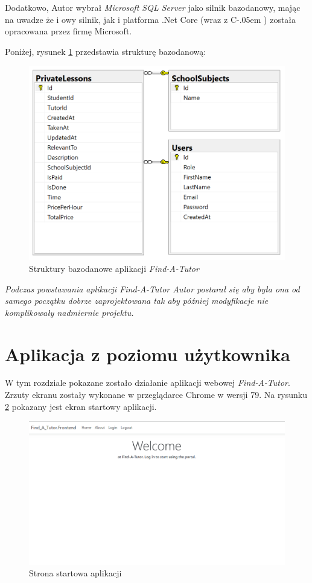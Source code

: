 \documentclass[12pt]{article}
\newcommand{\Csharp}{%
  {\settoheight{\dimen0}{C}C\kern-.05em \resizebox{!}{\dimen0}{\raisebox{\depth}{\# }}}}
\numberwithin{figure}{section}
\begin{document}
\begin{sloppypar}
Dodatkowo, Autor wybrał \textit{Microsoft SQL Server} jako silnik bazodanowy, mając na uwadze że i owy silnik, jak i platforma .Net Core (wraz z \Csharp) została opracowana przez firmę Microsoft. 
    
Poniżej, rysunek \ref{fig:db} przedstawia strukturę bazodanową: 
\begin{figure}[H] 
    \centering
    \includegraphics[width=.8\textwidth]{images/chapter_3/db.png}
    \caption{Struktury bazodanowe aplikacji \textit{Find-A-Tutor}}
    \label{fig:db}
\end{figure}
    
\textit{Podczas powstawania aplikacji Find-A-Tutor Autor postarał się aby była ona od samego początku dobrze zaprojektowana tak aby później modyfikacje nie komplikowały nadmiernie projektu. }

\newpage
\section{Aplikacja z poziomu użytkownika}
W tym rozdziale pokazane zostało działanie aplikacji webowej \textit{Find-A-Tutor}. Zrzuty ekranu zostały wykonane w przeglądarce Chrome w wersji 79. Na rysunku \ref{fig:home} pokazany jest ekran startowy aplikacji.

\begin{figure}[!htbp] 
    \centering
    \includegraphics[width=1\textwidth]{images/chapter_4/home.png}
    \caption{Strona startowa aplikacji}
    \label{fig:home}
\end{figure}


\end{sloppypar}
\end{document}
